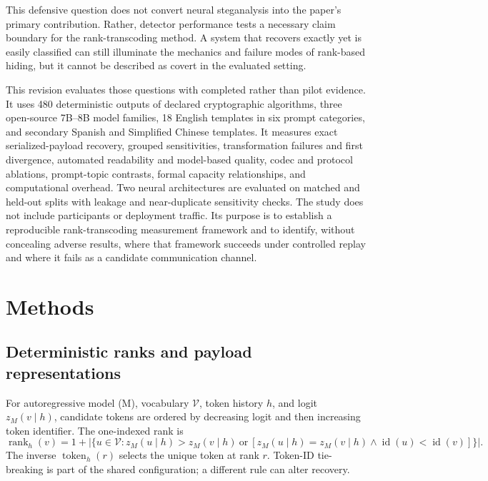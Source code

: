 \documentclass[fleqn,10pt]{wlscirep}
\newcommand{\Rank}{\operatorname{rank}}
\newcommand{\tok}{\operatorname{token}}
\begin{document}
This defensive question does not convert neural steganalysis into the paper's primary contribution. Rather, detector performance tests a necessary claim boundary for the rank-transcoding method. A system that recovers exactly yet is easily classified can still illuminate the mechanics and failure modes of rank-based hiding, but it cannot be described as covert in the evaluated setting.

This revision evaluates those questions with completed rather than pilot evidence. It uses 480 deterministic outputs of declared cryptographic algorithms, three open-source 7B--8B model families, 18 English templates in six prompt categories, and secondary Spanish and Simplified Chinese templates. It measures exact serialized-payload recovery, grouped sensitivities, transformation failures and first divergence, automated readability and model-based quality, codec and protocol ablations, prompt-topic contrasts, formal capacity relationships, and computational overhead. Two neural architectures are evaluated on matched and held-out splits with leakage and near-duplicate sensitivity checks. The study does not include participants or deployment traffic. Its purpose is to establish a reproducible rank-transcoding measurement framework and to identify, without concealing adverse results, where that framework succeeds under controlled replay and where it fails as a candidate communication channel.

\section*{Methods}\label{sec:methods}

\subsection*{Deterministic ranks and payload representations}\label{sec:rank-method}

For autoregressive model (M), vocabulary \(\mathcal V\), token history \(h\), and logit \(z_M(v\mid h)\), candidate tokens are ordered by decreasing logit and then increasing token identifier. The one-indexed rank is
\begin{equation}
\Rank_h(v)=1+\left|\{u\in\mathcal V:z_M(u\mid h)>z_M(v\mid h)\ \text{or}\ [z_M(u\mid h)=z_M(v\mid h)\land \operatorname{id}(u)<\operatorname{id}(v)]\}\right|.
\label{eq:rank}
\end{equation}
The inverse \(\tok_h(r)\) selects the unique token at rank \(r\). Token-ID tie-breaking is part of the shared configuration; a different rule can alter recovery.
\end{document}
